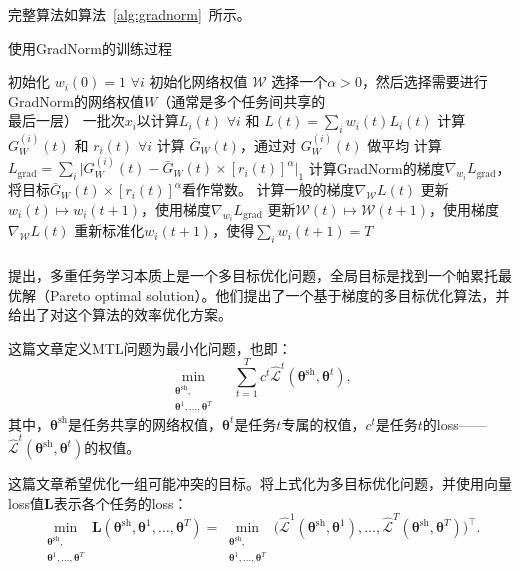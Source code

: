 \documentclass{ctexart}
\begin{document}
完整算法如算法~\ref{alg:gradnorm}~所示。

\begin{algorithm}[htb]
    \caption{使用GradNorm的训练过程}
    \label{alg:gradnorm}
 \begin{algorithmic}
    \STATE 初始化 $w_i(0)=1$ $\forall i$
    \STATE 初始化网络权值 $\mathcal{W}$
    \STATE 选择一个$\alpha> 0$，然后选择需要进行GradNorm的网络权值$W$（通常是多个任务间共享的\\ \hspace{1em} 最后一层）
    一批次$x_i$以计算$L_i(t)$ $\forall i$ 和 $L(t) = \sum_i w_i(t)L_i(t)$ {\fangsong [一般前向流程]}
    \STATE 计算 $G_W^{(i)}(t)$ 和 $r_i(t)$ $\forall i$
    \STATE 计算 $\bar{G}_W(t)$，通过对 $G_W^{(i)}(t)$ 做平均
    \STATE 计算 $L_{\text{grad}}= \sum_i\rvert G_W^{(i)}(t) - \bar{G}_W(t)\times [r_i(t)]^{\alpha}\rvert_1$
    \STATE 计算GradNorm的梯度$\nabla_{w_i} L_{\text{grad}}$，将目标$\bar{G}_W(t)\times [r_i(t)]^{\alpha}$看作常数。
    \STATE 计算一般的梯度$\nabla_{\mathcal{W}} L(t)$
    \STATE 更新$w_i(t) \mapsto w_i(t+1)$，使用梯度$\nabla_{w_i} L_{\text{grad}}$
    \STATE 更新$\mathcal{W}(t) \mapsto \mathcal{W}(t+1)$，使用梯度$\nabla_{\mathcal{W}} L(t)$ {\fangsong [一般反向流程]}
    \STATE 重新标准化$w_i(t+1)$，使得$\sum_iw_i(t+1) = T$
    \ENDFOR
 \end{algorithmic}
 \end{algorithm}

\subsubsection{}

\citet{Sener18Pareto}提出，多重任务学习本质上是一个多目标优化问题，全局目标是找到一个帕累托最优解（Pareto optimal solution）。他们提出了一个基于梯度的多目标优化算法，并给出了对这个算法的效率优化方案。

这篇文章定义MTL问题为最小化问题，也即：
\begin{equation}
    \min_{\substack{\bm\theta^\mathrm{sh},\\ \bm\theta^{1},\ldots ,\bm\theta^{T}}}\quad\sum_{t=1}^{T} c^t\hat{\mathcal{L}}^t(\bm\theta^\mathrm{sh}, \bm\theta^{t}),
\end{equation}
其中，$\bm\theta^\mathrm{sh}$是任务共享的网络权值，$\bm\theta^{t}$是任务$t$专属的权值，$c^t$是任务$t$的loss——$\hat{\mathcal{L}}^t(\bm\theta^\mathrm{sh}, \bm\theta^{t})$的权值。

这篇文章希望优化一组可能冲突的目标。\citet{Sener18Pareto}将上式化为多目标优化问题，并使用向量loss值$\mathbf{L}$表示各个任务的loss：
\begin{equation}
    \min_{\substack{\bm\theta^\mathrm{sh},\\ \bm\theta^1,\ldots,\bm\theta^T}} \mathbf{L}(\bm\theta^\mathrm{sh}, \bm\theta^1,\ldots,\bm\theta^T) =
    \min_{\substack{\bm\theta^\mathrm{sh},\\ \bm\theta^1,\ldots,\bm\theta^T}} \big( \hat{\mathcal{L}}^1(\bm\theta^\mathrm{sh},\bm\theta^1), \ldots,  \hat{\mathcal{L}}^T(\bm\theta^\mathrm{sh},\bm\theta^T) \big)^\intercal.
\end{equation}
\end{document}
